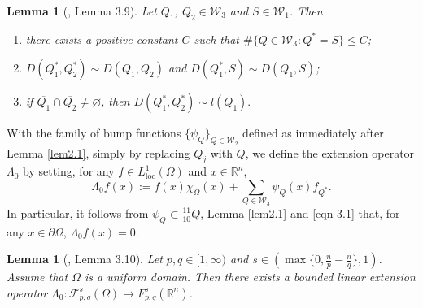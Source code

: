 \documentclass[11pt,twoside]{article}
\def\rn{{\mathbb{R}^n}}
\def\cf{{\mathcal F}}
\def\boz{{\Omega}}
\def\pa{\partial}                %
\def\huaf{{\cf}_{p,q}^s(\boz)}
\theoremstyle{mylem}
\newtheorem{lemma}[theorem]{Lemma}
\theoremstyle{definition}
\numberwithin{equation}{section}
\begin{document}
\begin{lemma}[\cite{ps2017}, Lemma 3.9]\label{lem5.1}
Let $Q_1$, $Q_2 \in \mathcal{W}_3$ and $S \in \mathcal{W}_1$. Then
\begin{enumerate}
\item[\rm(i)]there exists a positive constant $C$ such that $\#\{Q \in \mathcal{W}_3: Q^* = S\} \leq C$;
\item[\rm(ii)]
$D(Q_1^{*}, Q_2^{*}) \sim D(Q_1, Q_2)$ and $D(Q_1^{*}, S)\sim D(Q_1, S)$; 
\item[\rm(iii)]if $\overline{Q_1} \cap \overline{Q_2} \neq \varnothing$, then
$
D(Q_1^{*}, Q_2^{*}) \sim l(Q_1).
$
\end{enumerate}
\end{lemma}

With the family of bump functions $\{\psi_Q\}_{Q\in\mathcal{W}_2}$ defined as immediately after Lemma \ref{lem2.1}, simply by replacing $Q_j$ with $Q$, we define the extension operator $\Lambda_0$ by setting, for any $f \in L^1_{\text{loc}}(\Omega)$ and $x\in\rn$,
\begin{equation}\label{eqn-3.1}
\Lambda_0 f(x) := f(x)\chi_\Omega(x) + \sum_{Q\in\mathcal{W}_3} \psi_Q(x) f_{Q^{*}}.
\end{equation}
In particular, it follows from $\psi_Q\subset\frac{11}{10}Q$, Lemma \ref{lem2.1} and \eqref{eqn-3.1} that,
for any $x\in\pa\boz$, $\Lambda_0 f(x)=0$.

\begin{lemma}[\cite{ps2017}, Lemma 3.10]\label{L6.2}
Let $p,q \in [1, \infty)$ and $s\in(\max\{0,\frac{n}{p} - \frac{n}{q}\},1)$. Assume that $\boz$ is a uniform domain. Then there exists a bounded linear extension operator $\Lambda_0\colon \huaf \to F_{p,q}^{s}(\rn)$.
\end{lemma}
\end{document}
